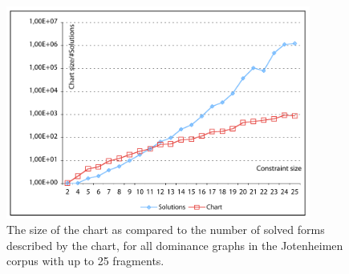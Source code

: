 \begin{figure}
\centering
\includegraphics[width=10cm]{chart-vs-solutions.pdf}
\caption{The size of the chart as compared to the number of solved
forms described by the chart, for all dominance graphs in the
Jotenheimen corpus with up to 25 fragments. \label{fig:chart-vs-solutions}}

\end{figure}






